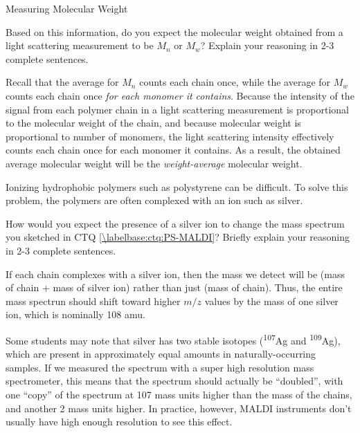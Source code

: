 \begin{activity}{Measuring Molecular Weight}
\begin{exercises}
		Based on this information, do you expect the molecular weight obtained from a light scattering measurement to be $M_n$ or $M_w$?  Explain your reasoning in 2-3 complete sentences.
		
		\begin{solution}{}
			Recall that the average for $M_n$ counts each chain once, while the average for $M_w$ counts each chain once \emph{for each monomer it contains}.  Because the intensity of the signal from each polymer chain in a light scattering measurement is proportional to the molecular weight of the chain, and because molecular weight is proportional to number of monomers, the light scattering intensity effectively counts each chain once for each monomer it contains.  As a result, the obtained average molecular weight will be the \emph{weight-average} molecular weight.
		\end{solution}
		
	
	
	\exercise Ionizing hydrophobic polymers such as polystyrene can be difficult.  To solve this problem, the polymers are often complexed with an ion such as silver.
	
		How would you expect the presence of a silver ion to change the mass spectrum you sketched in CTQ \ref{\labelbase:ctq:PS-MALDI}?  Briefly explain your reasoning in 2-3 complete sentences.
		
		\begin{solution}{}
			If each chain complexes with a silver ion, then the mass we detect will be (mass of chain + mass of silver ion) rather than just (mass of chain).  Thus, the entire mass spectrun should shift toward higher $m/z$ values by the mass of one silver ion, which is nominally 108 amu.
			
			Some students may note that silver has two stable isotopes (\textsuperscript{107}Ag and \textsuperscript{109}Ag), which are present in approximately equal amounts in naturally-occurring samples.  If we measured the spectrum with a super high resolution mass spectrometer, this means that the spectrum should actually be ``doubled'', with one ``copy'' of the spectrum at 107 mass units higher than the mass of the chains, and another 2 mass units higher.  In practice, however, MALDI instruments don't usually have high enough resolution to see this effect.
		\end{solution}
		
	
\end{exercises}


	
\end{activity}
